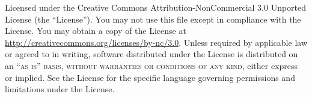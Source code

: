 \documentclass[oneside,11pt]{memoir} %
\begin{document}
\noindent Licensed under the Creative Commons Attribution-NonCommercial 3.0 Unported License (the ``License''). You may not use this file except in compliance with the License. You may obtain a copy of the License at \url{http://creativecommons.org/licenses/by-nc/3.0}. Unless required by applicable law or agreed to in writing, software distributed under the License is distributed on an \textsc{``as is'' basis, without warranties or conditions of any kind}, either express or implied. See the License for the specific language governing permissions and limitations under the License.\\ %

\tableofcontents %


%

\pagebreak

%

\end{document}
